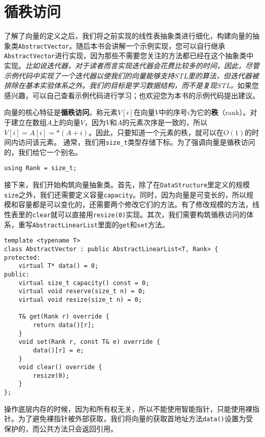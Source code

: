 \section{循秩访问}

了解了向量的定义之后，我们将之前实现的线性表抽象类进行细化，构建向量的抽象类\lstinline{AbstractVector}。随后本书会讲解一个示例实现，您可以自行继承\lstinline{AbstractVector}进行实现，因为那些不需要您关注的方法都已经在这个抽象类中实现。\textit{比如说迭代器，对于读者而言实现迭代器会花费比较多的时间，因此，尽管示例代码中实现了一个迭代器以使我们的向量能够支持STL里的算法，但迭代器被排除在基本实验体系之外。我们的目标是学习数据结构，而不是复现STL。}如果您感兴趣，可以自己查看示例代码进行学习；也欢迎您为本书的示例代码提出建议。

向量的核心特征是\textbf{循秩访问}。称元素$V[i]$在向量$V$中的序号$i$为它的\textbf{秩}（rank）。对于建立在数组$A$上的向量$V$，因为$V$和$A$的元素次序是一致的，所以$V[i] = A[i] = *(A+i)$。因此，只要知道一个元素的秩，就可以在$O(1)$的时间内访问该元素。
通常，我们用\lstinline{size_t}类型存储下标。为了强调向量是循秩访问的，我们给它一个别名。

\begin{lstlisting}
using Rank = size_t;
\end{lstlisting}

接下来，我们开始构筑向量抽象类。首先，除了在\lstinline{DataStructure}里定义的规模\lstinline{size}之外，我们还需要定义容量\lstinline{capacity}。同时，因为向量是可变长的，所以规模和容量都是可以变化的，还需要两个修改它们的方法。有了修改规模的方法，线性表里的\lstinline{clear}就可以直接用\lstinline{resize(0)}实现。其次，我们需要构筑循秩访问的体系，重写\lstinline{AbstractLinearList}里面的\lstinline{get}和\lstinline{set}方法。

\begin{lstlisting}
template <typename T>
class AbstractVector : public AbstractLinearList<T, Rank> {
protected:
    virtual T* data() = 0;
public:
    virtual size_t capacity() const = 0;
    virtual void reserve(size_t n) = 0;
    virtual void resize(size_t n) = 0;
    
    T& get(Rank r) override {
        return data()[r];
    }
    void set(Rank r, const T& e) override {
        data()[r] = e;
    }
    void clear() override {
        resize(0);
    }
};
\end{lstlisting}

操作底层内存的时候，因为和所有权无关，所以不能使用智能指针，只能使用裸指针。为了避免裸指针被外部获取，我们将向量的获取首地址方法\lstinline{data()}设置为受保护的，而公共方法只会返回引用。

